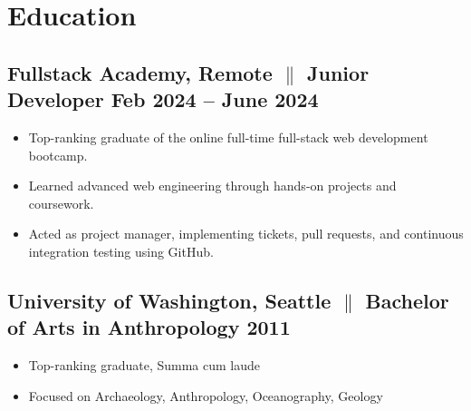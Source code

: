 \documentclass[a4paper,10pt]{article}
\begin{document}
\section{Education}
\subsection{Fullstack Academy, Remote {$\parallel$} {Junior Developer} \hfill
      \textbf{Feb
            2024 – June
            2024}}
\begin{itemize}
      \item Top-ranking graduate of the online full-time full-stack web
            development
            bootcamp.
      \item Learned advanced web engineering through
            hands-on
            projects and coursework.
      \item Acted as project manager, implementing tickets, pull requests, and
            continuous integration testing using GitHub.
\end{itemize}

\subsection{University of Washington, Seattle {$\parallel$}{ Bachelor of Arts in Anthropology} \hfill
      \textbf{2011}}
\begin{itemize}
      \item Top-ranking graduate, Summa cum laude
      \item Focused on Archaeology, Anthropology, Oceanography, Geology
\end{itemize}
\end{document}

